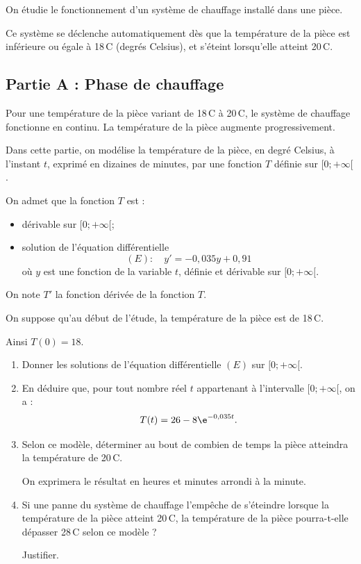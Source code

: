 On étudie le fonctionnement d'un système de chauffage installé dans une pièce.

Ce système se déclenche automatiquement dès que la température de la pièce est inférieure ou égale à 18\,\textdegree{}C (degrés Celsius), et s'éteint lorsqu'elle atteint 20\,\textdegree{}C.

	\subsection*{Partie A : Phase de chauffage}
		Pour une température de la pièce variant de 18\,\textdegree{}C à 20\,\textdegree{}C, le système de chauffage fonctionne en continu. La température de la pièce augmente progressivement.

		Dans cette partie, on modélise la température de la pièce, en degré Celsius, à l'instant $t$, exprimé en dizaines de minutes, par une fonction $T$ définie sur $[0 ;+\infty[$.

		On admet que la fonction $T$ est :
		\begin{itemize}[label={\textbullet~}]
			\item dérivable sur $[0 ;+\infty[$;
			\item solution de l'équation différentielle
			\[(E): \quad y'=-0,035 y+0,91\]
			où $y$ est une fonction de la variable $t$, définie et dérivable sur $[0 ;+\infty[$.
		\end{itemize}

		On note $T'$ la fonction dérivée de la fonction $T$.

		On suppose qu'au début de l'étude, la température de la pièce est de 18\,\textdegree{}C.

		Ainsi \quad $T(0)=18$.

		\begin{enumerate}
			\item Donner les solutions de l'équation différentielle $(E)$ sur $[0 ; +\infty[$.

			\item En déduire que, pour tout nombre réel $t$ appartenant à l'intervalle $[0 ;+\infty[$, on a :
			\[ T(t)=26-8 \e^{-0,035 t}.\]

			\item Selon ce modèle, déterminer au bout de combien de temps la pièce atteindra la température de 20\,\textdegree{}C.

			On exprimera le résultat en heures et minutes arrondi à la minute.

			\item Si une panne du système de chauffage l'empêche de s'éteindre lorsque la température de la pièce atteint 20\,\textdegree{}C, la température de la pièce pourra-t-elle dépasser 28\,\textdegree{}C selon ce modèle ?

			Justifier.
		\end{enumerate}

